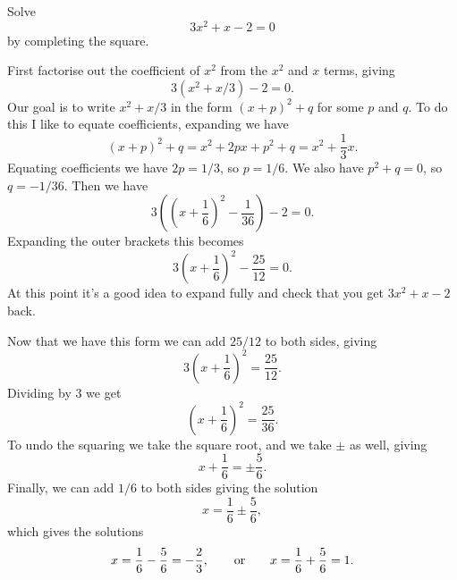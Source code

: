 \documentclass[fleqn]{LectureClass/LectureClass}
\begin{document}
    \begin{exm}{}{}
        Solve
        \begin{equation}
            3x^2 + x - 2 = 0
        \end{equation}
        by completing the square.
        
        First factorise out the coefficient of \(x^2\) from the \(x^2\) and \(x\) terms, giving
        \begin{equation}
            3(x^2 + x/3) - 2 = 0.
        \end{equation}
        Our goal is to write \(x^2 + x/3\) in the form \((x + p)^2 + q\) for some \(p\) and \(q\).
        To do this I like to equate coefficients, expanding we have
        \begin{equation}
            (x + p)^2 + q = x^2 + 2px + p^2 + q = x^2 + \frac{1}{3}x.
        \end{equation}
        Equating coefficients we have \(2p = 1/3\), so \(p = 1/6\).
        We also have \(p^2 + q = 0\), so \(q = -1/36\).
        Then we have
        \begin{equation}
            3\left( \left( x + \frac{1}{6} \right)^2 - \frac{1}{36} \right) - 2 = 0.
        \end{equation}
        Expanding the outer brackets this becomes
        \begin{equation}
            3\left( x + \frac{1}{6} \right)^2 - \frac{25}{12} = 0.
        \end{equation}
        At this point it's a good idea to expand fully and check that you get \(3x^2 + x - 2\) back.
        
        Now that we have this form we can add \(25/12\) to both sides, giving
        \begin{equation}
            3\left( x + \frac{1}{6} \right)^2 = \frac{25}{12}.
        \end{equation}
        Dividing by \(3\) we get
        \begin{equation}
            \left( x + \frac{1}{6} \right)^2 = \frac{25}{36}.
        \end{equation}
        To undo the squaring we take the square root, and we take \(\pm\) as well, giving
        \begin{equation}
            x + \frac{1}{6} = \pm \frac{5}{6}.
        \end{equation}
        Finally, we can add \(1/6\) to both sides giving the solution
        \begin{equation}
            x = \frac{1}{6} \pm \frac{5}{6},
        \end{equation}
        which gives the solutions
        \begin{equation}
            x = \frac{1}{6} - \frac{5}{6} = -\frac{2}{3}, \qquad\text{or}\qquad x = \frac{1}{6} + \frac{5}{6} = 1.
        \end{equation}
    \end{exm}
    
\end{document}

